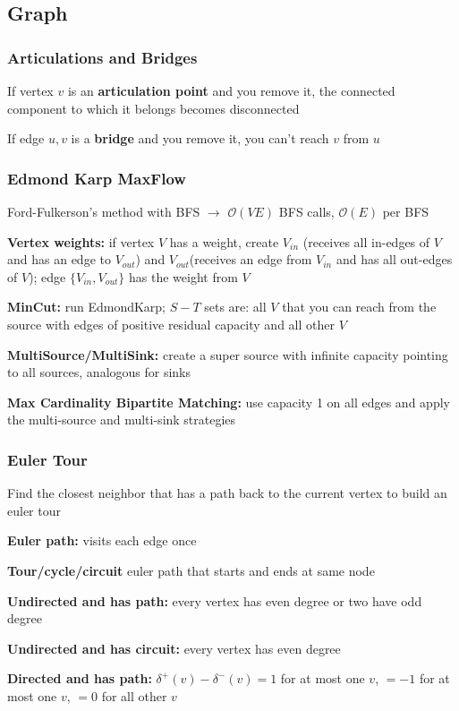 \documentclass[12pt, a4paper, twoside]{article}
\begin{document}
\subsection{Graph}
\subsubsection{Articulations and Bridges}
If vertex $v$ is an \textbf{articulation point} and you remove it, the connected component to which it belongs becomes disconnected

If edge $u,v$ is a \textbf{bridge} and you remove it, you can't reach $v$ from $u$

\subsubsection{Edmond Karp MaxFlow}
Ford-Fulkerson's method with BFS $\to$ $\mathcal{O}(VE)$ BFS calls, $\mathcal{O}(E)$ per BFS

\textbf{Vertex weights:} if vertex $V$ has a weight, create $V_{in}$ (receives all in-edges of $V$ and has an edge to $V_{out}$) and $V_{out}$(receives an edge from $V_{in}$ and has all out-edges of $V$); edge $\{V_{in}, V_{out}\}$ has the weight from $V$

\textbf{MinCut:} run EdmondKarp; $S-T$ sets are: all $V$ that you can reach from the source with edges of positive residual capacity and all other $V$

\textbf{MultiSource/MultiSink:} create a super source with infinite capacity pointing to all sources, analogous for sinks

\textbf{Max Cardinality Bipartite Matching:} use capacity 1 on all edges and apply the multi-source and multi-sink strategies

\subsubsection{Euler Tour}
Find the closest neighbor that has a path back to the current vertex to build an euler tour

\textbf{Euler path:} visits each edge once

\textbf{Tour/cycle/circuit} euler path that starts and ends at same node

\textbf{Undirected and has path:} every vertex has even degree or two have odd degree

\textbf{Undirected and has circuit:} every vertex has even degree

\textbf{Directed and has path:} $\delta^{+}(v) - \delta^{-}(v) = 1$ for at most one $v$, $= -1$ for at most one $v$, $= 0$ for all other $v$
\end{document}
